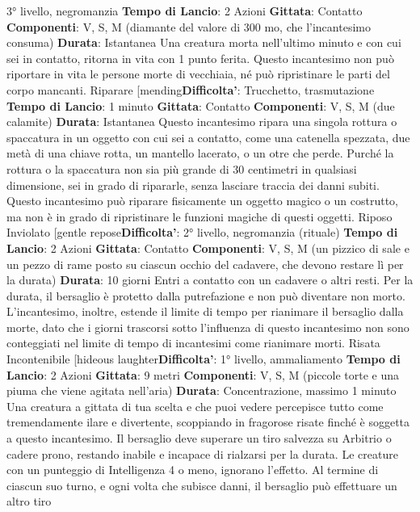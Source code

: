 \begin{multicols}{2}
3° livello, negromanzia
\textbf{Tempo di Lancio}: 2 Azioni
\textbf{Gittata}: Contatto
\textbf{Componenti}: V, S, M (diamante del valore di 300 mo,
che l’incantesimo consuma)
\textbf{Durata}: Istantanea
Una creatura morta nell’ultimo minuto e con cui sei in
contatto, ritorna in vita con 1 punto ferita. Questo
incantesimo non può riportare in vita le persone morte
di vecchiaia, né può ripristinare le parti del corpo
mancanti.
Riparare
[mending\textbf{Difficolta'}:
Trucchetto, trasmutazione
\textbf{Tempo di Lancio}: 1 minuto
\textbf{Gittata}: Contatto
\textbf{Componenti}: V, S, M (due calamite)
\textbf{Durata}: Istantanea
Questo incantesimo ripara una singola rottura o
spaccatura in un oggetto con cui sei a contatto, come
una catenella spezzata, due metà di una chiave rotta,
un mantello lacerato, o un otre che perde. Purché la
rottura o la spaccatura non sia più grande di 30
centimetri in qualsiasi dimensione, sei in grado di
ripararle, senza lasciare traccia dei danni subiti.
Questo incantesimo può riparare fisicamente un
oggetto magico o un costrutto, ma non è in grado di
ripristinare le funzioni magiche di questi oggetti.
Riposo Inviolato
[gentle repose\textbf{Difficolta'}:
2° livello, negromanzia (rituale)
\textbf{Tempo di Lancio}: 2 Azioni
\textbf{Gittata}: Contatto
\textbf{Componenti}: V, S, M (un pizzico di sale e un pezzo di
rame posto su ciascun occhio del cadavere, che
devono restare lì per la durata)
\textbf{Durata}: 10 giorni
Entri a contatto con un cadavere o altri resti. Per la
durata, il bersaglio è protetto dalla putrefazione e non
può diventare non morto.
L’incantesimo, inoltre, estende il limite di tempo per
rianimare il bersaglio dalla morte, dato che i giorni
trascorsi sotto l’influenza di questo incantesimo non 
sono conteggiati nel limite di tempo di incantesimi come
rianimare morti.
Risata Incontenibile
[hideous laughter\textbf{Difficolta'}:
1° livello, ammaliamento
\textbf{Tempo di Lancio}: 2 Azioni
\textbf{Gittata}: 9 metri
\textbf{Componenti}: V, S, M (piccole torte e una piuma che
viene agitata nell’aria)
\textbf{Durata}: Concentrazione, massimo 1 minuto
Una creatura a gittata di tua scelta e che puoi vedere
percepisce tutto come tremendamente ilare e
divertente, scoppiando in fragorose risate finché è
soggetta a questo incantesimo. Il bersaglio deve
superare un tiro salvezza su Arbitrio o cadere prono,
restando inabile e incapace di rialzarsi per la durata. Le
creature con un punteggio di Intelligenza 4 o meno,
ignorano l’effetto.
Al termine di ciascun suo turno, e ogni volta che
subisce danni, il bersaglio può effettuare un altro tiro

\end{multicols}

